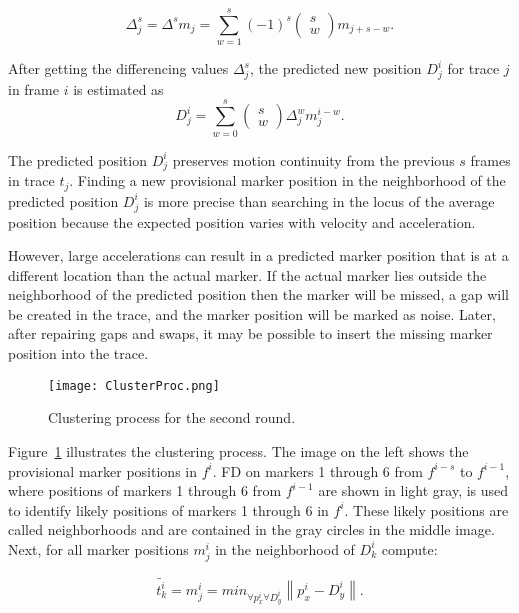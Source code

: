 \begin{equation}\label{eq:1}
\Delta_j^s=\Delta^sm_j=\sum_{w=1}^s(-1)^s\left(\begin{array}{c}s\\w\end{array}\right)m_{j+s-w}.
\end{equation}

After getting the differencing values $\Delta_j^s$, the predicted new position $D_j^i$ for trace $j$ in frame $i$ is estimated as 
\begin{equation}\label{eq:2}
D_j^i=\sum_{w=0}^s\left(\begin{array}{c}s\\w\end{array}\right)\Delta_j^wm_{j}^{i-w}.
\end{equation}

The predicted position $D_j^i$ preserves motion continuity from the previous $s$ frames in trace $t_j$. Finding a new provisional marker position in the neighborhood of the predicted position $D_j^i$ is more precise than searching in the locus of the average position because the expected position varies with velocity and acceleration.  

However, large accelerations can result in a predicted marker position that is at a different location than the actual marker.  If the actual marker lies outside the neighborhood of the predicted position then the marker will be missed, a gap will be created in the trace, and the marker position will be marked as noise.  Later, after repairing gaps and swaps, it may be possible to insert the missing marker position into the trace.   

\begin{figure}[tb]
\texttt{[image: ClusterProc.png]}
\caption{Clustering process for the second round.}
\label{fig:ClusterProc} 
\end{figure}

Figure~\ref{fig:ClusterProc} illustrates the clustering process. The image on the left shows the provisional marker positions in $f^i$.  FD on markers 1 through 6 from $f^{i-s}$ to $f^{i-1}$, where positions of markers 1 through 6 from $f^{i-1}$ are shown in light gray, is used to identify likely positions of markers 1 through 6 in $f^i$.  These likely positions are called neighborhoods and are contained in the gray circles in the middle image. Next, for all marker positions $m_j^i$ in the neighborhood of $D_k^i$  compute:

\begin{equation}\label{eq:3}
\tilde{t_k^i}=m_j^i=min_{\forall{p_x^i}\forall{D_y^i}}\left\|p_x^i-D_y^i\right\|.
\end{equation}

